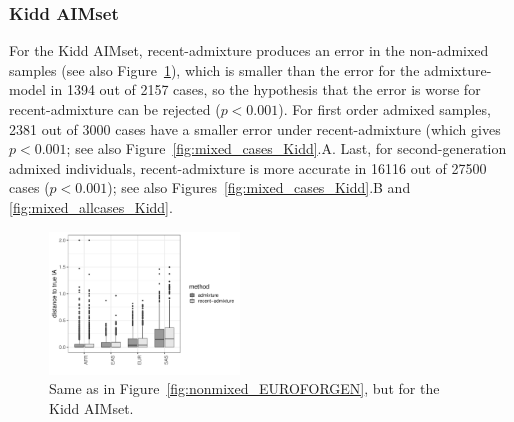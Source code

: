 \documentclass[12pt]{article}
\theoremstyle{definition}
\begin{document}
\subsubsection*{Kidd AIMset}
For the Kidd AIMset, recent-admixture produces an error in the
non-admixed samples (see also Figure~\ref{fig:nonmixed_Kidd}), which
is smaller than the error for the admixture-model in 1394 out of 2157
cases, so the hypothesis that the error is worse for recent-admixture
can be rejected ($p<0.001$). %
For first order admixed samples, 2381 out of 3000 cases have a smaller
error under recent-admixture (which gives $p<0.001$; %
see also Figure~\ref{fig:mixed_cases_Kidd}.A. Last, for
second-generation admixed individuals, recent-admixture is more
accurate in 16116 out of 27500 cases ($p<0.001$); %
see also Figures~\ref{fig:mixed_cases_Kidd}.B and
\ref{fig:mixed_allcases_Kidd}.

\begin{figure}[H]
  \begin{center}
    \includegraphics[width=0.45\textwidth]{deviations_nonmixed_Kidd.pdf}
  \end{center}
  \caption{\label{fig:nonmixed_Kidd} Same as in
    Figure~\ref{fig:nonmixed_EUROFORGEN}, but for the Kidd AIMset.}
\end{figure}
\end{document}
